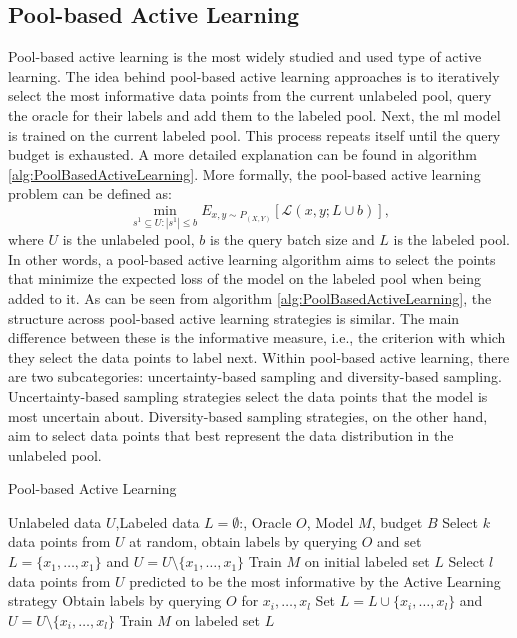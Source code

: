 \subsection{Pool-based Active Learning}
\label{sec:PoolBasedActiveLearning}
Pool-based active learning is the most widely studied and used type of active learning. The idea behind pool-based active learning approaches
is to iteratively select the most informative data points from the current unlabeled pool, query the oracle for their labels and add them to the
labeled pool. Next, the \gls{ml} model is trained on the current labeled pool. This process repeats itself until the query budget is exhausted.
A more detailed explanation can be found in algorithm \ref{alg:PoolBasedActiveLearning}. More formally, the pool-based active learning problem
can be defined as:
\begin{equation}
    \min_{s^1 \subseteq U: |s^1| \leq b} E_{x,y \sim P_{(X,Y)}}[\mathcal{L}(x,y;L \cup b)],
\end{equation}
where $U$ is the unlabeled pool, $b$ is the query batch size and $L$ is the labeled pool.
In other words, a pool-based active learning algorithm aims to select the points that minimize the expected loss of the model on the labeled pool when
being added to it. As can be seen from  algorithm \ref{alg:PoolBasedActiveLearning}, the structure across pool-based active learning strategies is similar.
The main difference between these is the informative measure, i.e., the criterion with which they select the data points to label next. Within 
pool-based active learning, there are two subcategories: uncertainty-based sampling and diversity-based sampling. 
Uncertainty-based sampling strategies select the data points that the model is most uncertain about. Diversity-based sampling strategies, on the other
hand, aim to select data points that best represent the data distribution in the unlabeled pool.

\begin{algorithm}
    \caption{Pool-based Active Learning} \label{alg:PoolBasedActiveLearning}
    \begin{algorithmic}[1]
        \Require Unlabeled data $U$,Labeled data $L = \emptyset$:, Oracle $O$, Model $M$, budget $B$
        \State Select $k$ data points from $U$ at random, obtain labels by querying $O$ and set $L=\{x_1,\ldots,x_1\}$
        and $U = U \setminus \{x_1,\ldots,x_1\}$ 
        \State Train $M$ on initial labeled set $L$
            \State Select $l$ data points from $U$ predicted to be the most informative by the Active Learning strategy
            \State Obtain labels by querying $O$ for $x_i,\ldots,x_l$
            \State Set $L= L \cup \{x_i,\ldots,x_l\}$ and $U = U \setminus \{x_i,\ldots,x_l\}$
            \State Train $M$ on labeled set $L$
        \EndWhile
    \end{algorithmic}
\end{algorithm}


